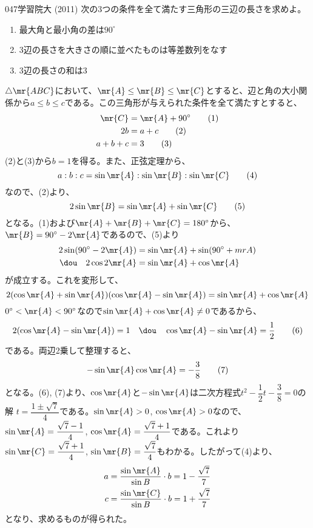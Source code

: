 \begin{thm}{047}{}{学習院大 (2011)}
 次の3つの条件を全て満たす三角形の三辺の長さを求めよ。
 \begin{enumerate}
  \renewcommand{\labelenumi}{(\alph{enumi})}
  \item 最大角と最小角の差は$90^\circ$
  \item 3辺の長さを大きさの順に並べたものは等差数列をなす
  \item 3辺の長さの和は3
 \end{enumerate}
\end{thm}

$\triangle\mr{ABC}$において、$\mr{A}\le\mr{B}\le\mr{C}$とすると、辺と角の大小関係から$a\le b\le c$である。この三角形が与えられた条件を全て満たすとすると、
\begin{align*}
 \mr{C}&=\mr{A}+90^\circ \tag{1} \\
 2b&=a+c \tag{2} \\
 a+b+c&=3 \tag{3}
\end{align*}
(2)と(3)から$b=1$を得る。また、正弦定理から、
\[ a:b:c=\sin\mr{A}:\sin\mr{B}:\sin\mr{C} \tag{4} \]
なので、(2)より、
\[ 2\sin\mr{B}=\sin\mr{A}+\sin\mr{C} \tag{5} \]
となる。(1)および$\mr{A}+\mr{B}+\mr{C}=180^\circ$から、$\mr{B}=90^\circ-2\mr{A}$であるので、(5)より
\begin{align*}
 2\sin(90^\circ-2\mr{A})&= \sin\mr{A}+\sin(90^\circ+mr{A}) \\
 \dou\quad 2\cos 2\mr{A} &= \sin\mr{A}+\cos\mr{A}
\end{align*}
が成立する。これを変形して、
\[ 2(\cos\mr{A}+\sin\mr{A})(\cos\mr{A}-\sin\mr{A})=\sin\mr{A}+\cos\mr{A} \]
$0^\circ < \mr{A}<90^\circ$なので$\sin\mr{A}+\cos\mr{A}\neq 0$であるから、
\[ 2(\cos\mr{A}-\sin\mr{A})=1 \quad\dou\quad \cos\mr{A}-\sin\mr{A}=\frac{1}{2} \tag{6} \]
である。両辺2乗して整理すると、
\[-\sin\mr{A}\cos\mr{A}=-\frac{3}{8} \tag{7} \]
となる。(6), (7)より、$\cos\mr{A}$と$-\sin\mr{A}$は二次方程式$t^2-\dfrac{1}{2}t-\dfrac{3}{8}=0$の解 $t=\dfrac{1\pm\sqrt{7}}{4}$である。$\sin\mr{A}>0$, $\cos\mr{A}>0$なので、$\sin\mr{A}=\dfrac{\sqrt{7}-1}{4}$, $\cos\mr{A}=\dfrac{\sqrt{7}+1}{4}$である。これより$\sin\mr{C}=\dfrac{\sqrt{7}+1}{4}$, $\sin\mr{B}=\dfrac{\sqrt{7}}{4}$もわかる。したがって(4)より、
\begin{align*}
 a&=\frac{\sin\mr{A}}{\sin{B}}\cdot b=1-\frac{\sqrt{7}}{7} \\
 c&=\frac{\sin\mr{C}}{\sin{B}}\cdot b=1+\frac{\sqrt{7}}{7} \\
\end{align*}
となり、求めるものが得られた。